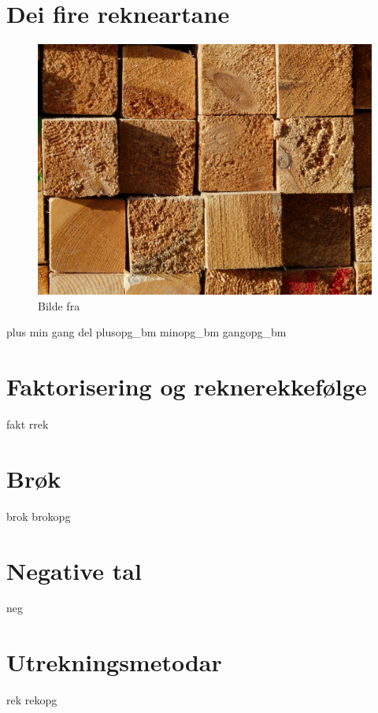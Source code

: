 \chapter{Dei fire rekneartane \label{Rekneartane}}
\begin{figure}
	\centering
	\includegraphics[scale=0.38]{wood} \\
{\footnotesize Bilde fra } 
\end{figure}
\newpage
{plus}
{min}
{gang}
{del}
\opgt
{plusopg_bm}
{minopg_bm}
{gangopg_bm}

\chapter{Faktorisering og reknerekkefølge \label{Faktogreknrekflg}}
\newpage
{fakt}
{rrek}

\chapter{Brøk \label{Brok}}
\newpage
{brok}
\newpage
{brokopg}

\chapter{Negative tal \label{Negtal}}
\newpage
{neg}

\chapter{Utrekningsmetodar \label{Utrekning}}
\newpage
{rek}
\newpage
{rekopg}

